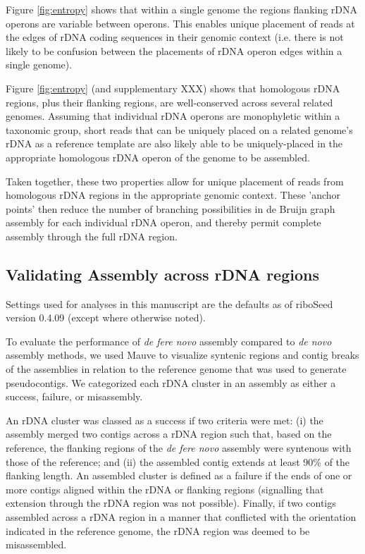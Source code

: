 \documentclass[10pt]{article}
\begin{document}
\begin{linenumbers}
Figure \ref{fig:entropy} shows that within a single genome the regions flanking rDNA operons are variable between operons. This enables unique placement of reads at the edges of rDNA coding sequences in their genomic context (i.e. there is not likely to be confusion between the placements of rDNA operon edges within a single genome).


Figure \ref{fig:entropy} (and supplementary XXX) shows that homologous rDNA regions, plus their flanking regions, are well-conserved across several related genomes. Assuming that individual rDNA operons are monophyletic within a taxonomic group, short reads that can be uniquely placed on a related genome's rDNA as a reference template are also likely able to be uniquely-placed in the appropriate homologous rDNA operon of the genome to be assembled.


Taken together, these two properties allow for unique placement of reads from homologous rDNA regions in the appropriate genomic context. These 'anchor points' then reduce the number of branching possibilities in de Bruijn graph assembly for each individual rDNA operon, and thereby permit complete assembly through the full rDNA region.


\subsection*{Validating Assembly across rDNA regions}

Settings used for analyses in this manuscript are the defaults as of riboSeed version 0.4.09 (except where otherwise noted).


To evaluate the performance of \textit{de fere novo} assembly compared to \textit{de novo} assembly methods, we used Mauve to visualize syntenic regions and contig breaks of the assemblies in relation to the reference genome that was used to generate pseudocontigs. We categorized each rDNA cluster in an assembly as either a success, failure, or misassembly.


An rDNA cluster was classed as a success if two criteria were met: (i) the assembly merged two contigs across a rDNA region such that, based on the reference, the flanking regions of the \textit{de fere novo} assembly were syntenous with those of the reference; and (ii) the assembled contig extends at least 90\% of the flanking length. An assembled cluster is defined as a failure if the ends of one or more contigs aligned within the rDNA or flanking regions (signalling that extension through the rDNA region was not possible). Finally, if two contigs assembled across a rDNA region in a manner that conflicted with the orientation indicated in the reference genome, the rDNA region was deemed to be misassembled.



\end{linenumbers}
\end{document}
